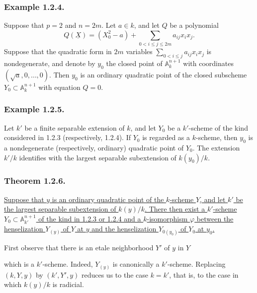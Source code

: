 \subsubsection*{Example 1.2.4.}
Suppose that $p=2$ and $n=2m$.  Let $a\in k$, and let $Q$ be a
polynomial
\[
Q(\underline X)=(X_0^2-a)
 +\sum_{0<i\leq j\leq2m}a_{ij}x_ix_j.
\]
Suppose that the quadratic form in $2m$ variables
$\sum_{0<i\leq j}a_{ij}x_ix_j$ is nondegenerate, and denote by $y_0$
the closed point of $\mathbb A_k^{n+1}$ with coordinates
$(\sqrt a,0,\ldots,0)$.  Then $y_0$ is an ordinary quadratic point
of the closed subscheme $Y_0\subset\mathbb A_k^{n+1}$ with equation
$Q=0$.

\subsubsection*{Example 1.2.5.}
Let $k'$ be a finite separable extension of $k$, and let $Y_0$ be a
$k'$-scheme of the kind considered in 1.2.3 (respectively, 1.2.4).
If $Y_0$ is regarded as a $k$-scheme, then $y_0$ is a nondegenerate
(respectively, ordinary) quadratic point of $Y_0$.  The extension
$k'/k$ identifies with the largest separable subextension of
$k(y_0)/k$.

\subsubsection*{Theorem 1.2.6.}
\underline{Suppose that $y$ is an ordinary quadratic point of the
$k$-scheme $Y$, and let $k'$ be the largest separable subextension
of $k(y)/k$.  There then exist a $k'$-scheme
$Y_0\subset\mathbb A_{k'}^{n+1}$ of the kind in 1.2.3 or 1.2.4 and a
$k$-isomorphism $\varphi$ between the henselization $Y_{(y)}$ of $Y$
at $y$ and the henselization $Y_{0(y_0)}$ of $Y_0$ at $y_0$.}

First observe that there is an etale neighborhood $Y'$ of $y$ in
$Y$
\begin{center}
\end{center}
which is a $k'$-scheme.  Indeed, $Y_{(y)}$ is canonically a
$k'$-scheme.  Replacing $(k,Y,y)$ by $(k',Y',y)$ reduces us to the
case $k=k'$, that is, to the case in which $k(y)/k$ is radicial.

